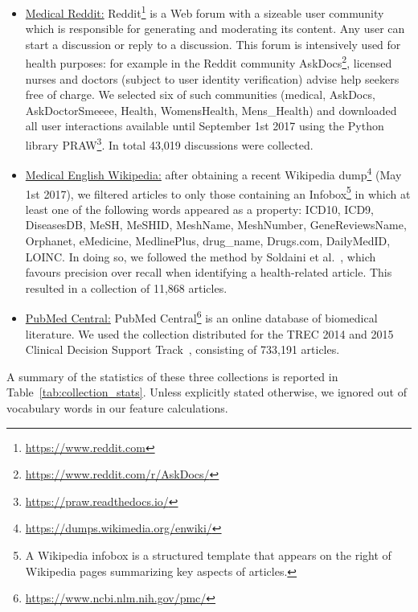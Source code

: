 \begin{itemize}[leftmargin=*]
\item \underline{Medical Reddit:} Reddit\footnote{\url{https://www.reddit.com}} is a Web forum with a sizeable user community which is responsible for generating and moderating its content. Any user can start a discussion or reply to a discussion. This forum is intensively used for health purposes: for example in the Reddit community AskDocs\footnote{\url{https://www.reddit.com/r/AskDocs/}}, licensed nurses and doctors (subject to user identity verification) advise help seekers free of charge. We selected six of such communities
    (medical, AskDocs, AskDoctorSmeeee, Health, WomensHealth, Mens\_Health) and downloaded all user interactions available until September 1st 2017 using the Python library PRAW\footnote{\url{https://praw.readthedocs.io/}}. In total 43,019 discussions were collected.

\item \underline{Medical English Wikipedia:} after obtaining a recent Wikipedia dump\footnote{\url{https://dumps.wikimedia.org/enwiki/}} (May 1st 2017), we filtered articles to only those containing an Infobox\footnote{A Wikipedia infobox is a structured template that appears on the right of Wikipedia pages summarizing key aspects of articles.} in which at least one of the following words appeared as a property: ICD10, ICD9, DiseasesDB, MeSH, MeSHID, MeshName, MeshNumber, GeneReviewsName, Orphanet, eMedicine, MedlinePlus, drug\_name, Drugs.com, DailyMedID, LOINC.
In doing so, we followed the method by Soldaini et al.~\cite{soldaini15}, which favours precision over recall when identifying a health-related article. This resulted in a collection of 11,868 articles. 

\item \underline{PubMed Central:} PubMed Central\footnote{\url{https://www.ncbi.nlm.nih.gov/pmc/}} is an online  database of biomedical literature. We used the collection distributed for the TREC 2014 and 2015 Clinical Decision Support Track~\cite{roberts16,trec15}, consisting of 733,191 articles. 
 
\end{itemize}

A summary of the statistics of these three collections is reported in Table~\ref{tab:collection_stats}. 
Unless explicitly stated otherwise, we ignored out of vocabulary words in our feature calculations.

